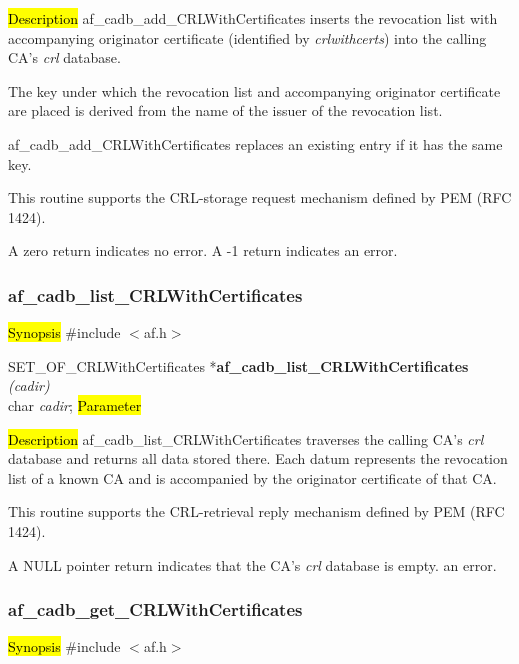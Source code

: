 \hl{Description}
af\_cadb\_add\_CRLWithCertificates inserts the revocation list with accompanying originator certificate
(identified by {\em crlwithcerts}) into the calling CA's {\em crl} database. 

The key under which the revocation list and accompanying originator certificate are placed is derived 
from the name of the issuer of the revocation list.

af\_cadb\_add\_CRLWithCertificates replaces an existing entry if it has the same key.

This routine supports the CRL-storage request mechanism defined by PEM (RFC 1424).

A  zero return indicates no error.
A -1 return indicates an error.




\subsubsection{af\_cadb\_list\_CRLWithCertificates}
\label{af_cadb_list_CRLWithCertificates}
\hl{Synopsis}
\#include $<$af.h$>$

SET\_OF\_CRLWithCertificates *{\bf af\_cadb\_list\_CRLWithCertificates} {\em (cadir)} \\
char	{\em *cadir};
\hl{Parameter}

\hl{Description}
af\_cadb\_list\_CRLWithCertificates traverses the calling CA's {\em crl} database and returns all data
stored there. Each datum represents the revocation list of a known CA and is accompanied by
the originator certificate of that CA.

This routine supports the CRL-retrieval reply mechanism defined by PEM (RFC 1424).

A NULL pointer return indicates
\bi
\m that the CA's {\em crl} database is empty.
\m an error.
\ei




\subsubsection{af\_cadb\_get\_CRLWithCertificates}
\label{af_cadb_get_CRLWithCertificates}
\hl{Synopsis}
\#include $<$af.h$>$

